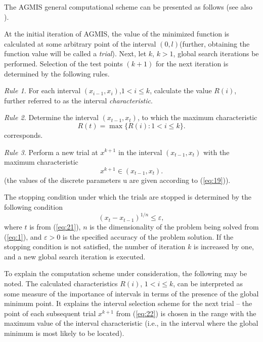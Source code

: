 \documentclass{svproc}
\begin{document}
The AGMIS general computational scheme can be presented as follows (see also \cite{c21}).

At the initial iteration of AGMIS, the value of the minimized function is calculated at some arbitrary point of the interval $(0,l)$(further, obtaining the function value will be called a \textit{trial}). Next, let $k$, $k > 1$, global search iterations be performed. Selection of the test points $(k+1)$ for the next iteration is determined by the following rules.

\textit{Rule 1.} For each interval $(x_{i-1}, x_i)$,$1<i \leq k$, calculate the value $R(i)$, further referred to as the interval \textit{characteristic}. 

\textit{Rule 2.} Determine the interval $(x_{t-1}, x_t)$, to which the maximum characteristic
\begin{equation}\label{eq:21}
R(t)=\max\{R(i): 1<i\leq k\}.
\end{equation}
corresponds.

\textit{Rule 3.} Perform a new trial at $x^{k+1}$ in the interval $(x_{t-1}, x_t)$ with the maximum characteristic
\begin{equation}\label{eq:22}
x^{k+1} \in (x_{t-1}, x_t).
\end{equation}
(the values of the discrete parameters u are given according to (\ref{eq:19})).

 The stopping condition under which the trials are stopped is determined by the following condition
\begin{equation}\label{eq:23}
(x_t - x_{t-1})^{1/n} \leq \varepsilon, 
\end{equation}
where $t$ is from (\ref{eq:21}), $n$ is the dimensionality of the problem being solved from (\ref{eq:1}), and $\varepsilon > 0$ is the specified accuracy of the problem solution. If the stopping condition is not satisfied, the number of iteration $k$ is increased by one, and a new global search iteration is executed.

   To explain the computation scheme under consideration, the following may be noted. The calculated characteristics $R(i)$, $1<i \leq k$, can be interpreted as some measure of the importance of intervals in terms of the presence of the global minimum point. It explains the interval selection scheme for the next trial -- the point of each subsequent trial $x^{k+1}$ from (\ref{eq:22}) is chosen in the range with the maximum value of the interval characteristic (i.e., in the interval  where the global minimum is most likely to be located).
\end{document}
